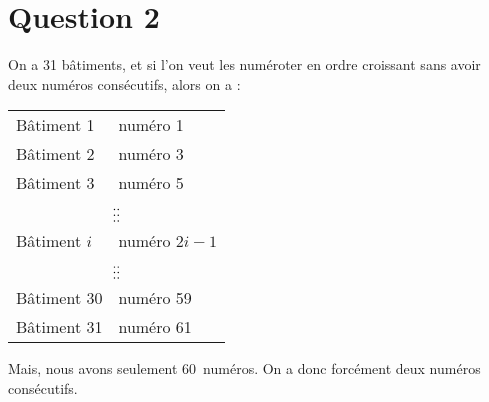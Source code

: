 \section*{Question 2}
On a 31 bâtiments, et si l’on veut les numéroter en ordre croissant sans avoir deux numéros consécutifs, alors on a :

\begin{center}
	\begin{tabular}{l@{ $\rightarrow$ }l}
		 Bâtiment 1  & numéro 1                                          \\
		 Bâtiment 2  & numéro 3                                          \\
		 Bâtiment 3  & numéro 5                                          \\
		\multicolumn{2}{c}{$\hfill\vdots\hfill\hfill\hfill\vdots\hfill\hfill$} \\
		Bâtiment $i$ & numéro $2 i - 1$                                  \\
		\multicolumn{2}{c}{$\hfill\vdots\hfill\hfill\hfill\vdots\hfill\hfill$} \\
		Bâtiment 30  & numéro 59                                         \\
		Bâtiment 31  & numéro 61
	\end{tabular}
	\end{center}

Mais, nous avons seulement 60~numéros. On a donc forcément deux numéros consécutifs.